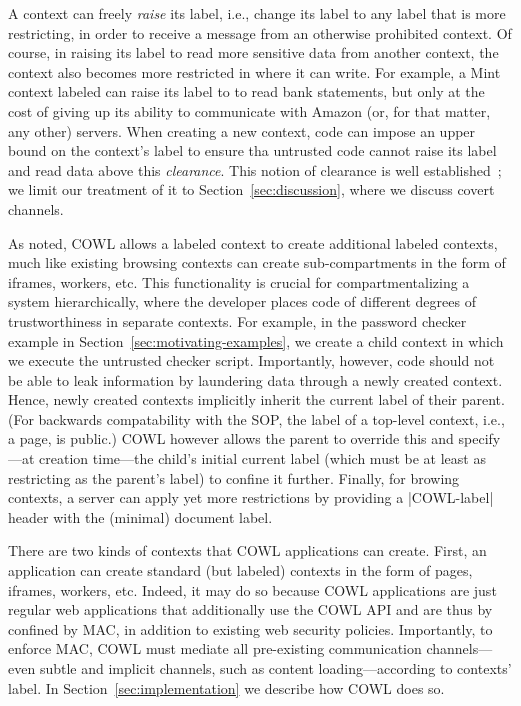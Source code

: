 A context can freely \emph{raise} its label, i.e., change its label to
any label that is more restricting, in order to receive a message
from an otherwise prohibited context.
%
Of course, in raising its label to read more sensitive data from
another context, the context also becomes more restricted in where it
can write.
%
For example, a Mint context labeled
 can raise its label to
 to read bank statements, but
only at the cost of giving up its ability to communicate with Amazon
(or, for that matter, any other) servers.
%
When creating a new context, code can impose an upper bound on the
context's label to ensure tha untrusted code cannot raise its label
and read data above this \emph{clearance}.
%
This notion of clearance is well
established~\cite{efstathopoulos:asbestos, Zeldovich:2006,
  stefan:2011:flexible, Breeze13}; we limit our treatment of it to
Section~\ref{sec:discussion}, where we discuss covert channels.

As noted, COWL allows a labeled context to create additional labeled contexts,
much like existing browsing contexts can create sub-compartments
in the form of iframes, workers, etc.
%
This functionality is crucial for compartmentalizing a system
hierarchically, where the developer places code of different degrees
of trustworthiness in separate contexts.
%
For example, in the password checker example in
Section~\ref{sec:motivating-examples}, we create a child context in
which we execute the untrusted checker script.
%
Importantly, however, code should not be able to leak information by
laundering data through a newly created context.
%
Hence, newly created contexts implicitly inherit the current label of
their parent.
%
(For backwards compatability with the SOP, the label of a top-level
context, i.e., a page, is public.)
%
COWL however allows the parent to override this and specify---at
creation time---the child's initial current label (which must be at
least as restricting as the parent's label) to confine it further.
%
Finally, for browing contexts, a server can apply yet more restrictions
by providing a \js|COWL-label| header with the (minimal) document label.

There are two kinds of contexts that COWL applications can create.
%
First, an application can create standard (but labeled) contexts in
the form of pages, iframes, workers, etc.
%
Indeed, it may do so because COWL applications are just regular web
applications that additionally use the COWL API and are thus by
confined by MAC, in addition to existing web security policies.
%
Importantly, to enforce MAC, COWL must mediate all pre-existing
communication channels---even subtle and implicit channels, such as
content loading---according to contexts' label.
%
In Section~\ref{sec:implementation} we describe how COWL does so.


